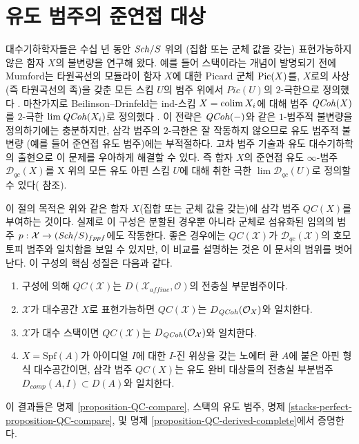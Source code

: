 \section{유도 범주의 준연접 대상}
\label{section-QC}

\noindent
대수기하학자들은 수십 년 동안 $\mathit{Sch}/S$ 위의 (집합 또는 군체 값을
갖는) 표현가능하지 않은 함자 $X$의 불변량을 연구해 왔다. 예를 들어
스택이라는 개념이 발명되기 전에 Mumford는 타원곡선의 모듈라이 함자
$X$에 대한 Picard 군체 $\mathop{\mathrm{Pic}}\nolimits(X)$를, $X$로의 사상(즉 타원곡선의
족)을 갖춘 모든 스킴 $U$의 범주 위에서 $Pic(U)$의 $2$-극한으로
정의했다 \cite{mumford_picard}. 마찬가지로 Beilinson--Drinfeld는
ind-스킴 $X = \mathop{\mathrm{colim}}\nolimits X_i$에 대해 범주 $\mathit{QCoh}(X)$를
$2$-극한 $\mathop{\mathrm{lim}}\nolimits \mathit{QCoh}(X_i)$로 정의했다 \cite{BVGD}.
이 전략은 $\mathit{QCoh}(-)$와 같은 $1$-범주적 불변량을 정의하기에는 충분하지만,
삼각 범주의 $2$-극한은 잘 작동하지 않으므로 유도 범주적 불변량
(예를 들어 준연접 유도 범주)에는 부적절하다. 고차 범주 기술과
유도 대수기하학의 출현으로 이 문제를 우아하게 해결할 수 있다.
즉 함자 $X$의 준연접 유도 $\infty$-범주 $\mathcal{D}_{qc}(X)$를
X 위의 모든 유도 아핀 스킴 $U$에 대해 취한 극한
$\lim \mathcal{D}_{qc}(U)$로 정의할 수 있다(\cite{lurie-thesis} 참조).

\medskip\noindent
이 절의 목적은 위와 같은 함자 $X$(집합 또는 군체 값을 갖는)에
삼각 범주 $\mathit{QC}(X)$를 부여하는 것이다. 실제로 이 구성은
분할된 경우뿐 아니라 군체로 섬유화된 임의의 범주
$p : \mathcal{X} \to (\mathit{Sch}/S)_{fppf}$에도 작동한다. 좋은 경우에는
$\mathit{QC}(\mathcal{X})$가 $\mathcal{D}_{qc}(\mathcal{X})$의
호모토피 범주와 일치함을 보일 수 있지만, 이 비교를 설명하는 것은
이 문서의 범위를 벗어난다. 이 구성의 핵심 성질은 다음과 같다.
\begin{enumerate}
\item[(a)] 구성에 의해 $\mathit{QC}(\mathcal{X})$는
$D(\mathcal{X}_{affine}, \mathcal{O})$의 전충실 부분범주이다.
\item[(b)] $\mathcal{X}$가 대수공간 $X$로 표현가능하면
$\mathit{QC}(\mathcal{X})$는 $D_{\mathit{QCoh}}(\mathcal{O}_X)$와 일치한다.
\item[(c)] $\mathcal{X}$가 대수 스택이면 $\mathit{QC}(\mathcal{X})$는
$D_{\mathit{QCoh}}(\mathcal{O}_\mathcal{X})$와 일치한다.
\item[(d)] $X = \text{Spf}(A)$가 아이디얼 $I$에 대한 $I$-진 위상을
갖는 노에터 환 $A$에 붙은 아핀 형식 대수공간이면, 삼각 범주
$\mathit{QC}(X)$는 유도 완비 대상들의 전충실 부분범주
$D_{comp}(A, I) \subset D(A)$와 일치한다.
\end{enumerate}
이 결과들은 명제 \ref{proposition-QC-compare}, 스택의 유도 범주,
명제 \ref{stacks-perfect-proposition-QC-compare}, 및 명제
\ref{proposition-QC-derived-complete}에서 증명한다.

